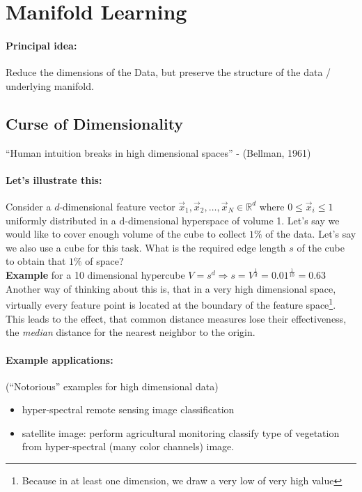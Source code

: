 
\section{Manifold Learning}
\paragraph{Principal idea:} Reduce the dimensions of the Data, but preserve the structure of the data / underlying manifold.

\subsection{Curse of Dimensionality}
``Human intuition breaks in high dimensional spaces'' - (Bellman, 1961)

\paragraph{Let's illustrate this:}
Consider a $d$-dimensional feature vector $\vec{x}_1, \vec{x}_2, \dots, \vec{x}_N \in \mathbb{R}^d$ where $0 \le\vec{x}_i\le 1$ uniformly distributed in a d-dimensional hyperspace of volume 1.
Let's say we would like to cover enough volume of  the cube to collect $1\%$ of the data. Let's say we also use a cube for this task. What is the required edge length $s$ of the cube to obtain that $1\%$ of space?\\

\textbf{Example} for a 10 dimensional hypercube $V=s^d \Rightarrow s = V^{\frac{1}{d}} = 0.01^{\frac{1}{10}} = 0.63$\\

Another way of thinking about this is, that in a very high dimensional space, virtually every feature point is located at the boundary of the feature space\footnote{Because in at least one dimension, we draw a very low of very high value}. This leads to the effect, that common distance measures lose their effectiveness, \eg the \textit{median} distance for the nearest neighbor to the origin.

\paragraph{Example applications:}
(``Notorious'' examples for high dimensional data)

\begin{itemize}
    \item hyper-spectral remote sensing image classification
    \item satellite image: perform \eg agricultural monitoring classify type of vegetation from hyper-spectral (many color channels) image.
\end{itemize}

